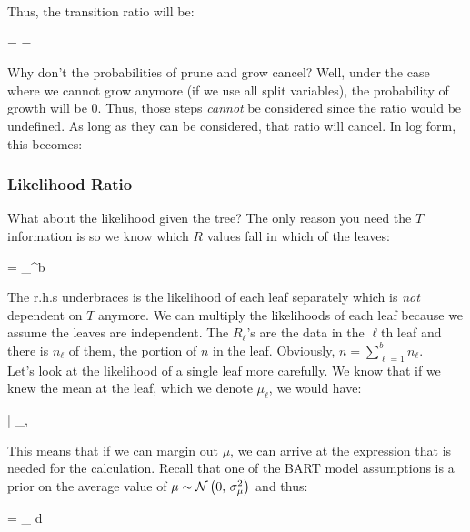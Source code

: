 Thus, the transition ratio will be:

\beqn
{} =  =  
\eeqn

Why don't the probabilities of prune and grow cancel? Well, under the case where we cannot grow anymore (if we use all split variables), the probability of growth will be 0. Thus, those steps \textit{cannot} be considered since the ratio would be undefined. As long as they can be considered, that ratio will cancel. In log form, this becomes:


\subsubsection*{Likelihood Ratio}


What about the likelihood given the tree? The only reason you need the $T$ information is so we know which $R$ values fall in which of the leaves:

\beqn
{} = \prod_{}^{b} \underbrace{\cprob{\Rlonetonl}{\sigsq}}
\eeqn

The r.h.s underbraces is the likelihood of each leaf separately which is \textit{not} dependent on $T$ anymore. We can multiply the likelihoods of each leaf because we assume the leaves are independent. The $R_\ell$'s are the data in the $\ell$th leaf and there is $n_\ell$ of them, the portion of $n$ in the leaf. Obviously, $n = \sum_{\ell=1}^b n_\ell$.\\

Let's look at the likelihood of a single leaf more carefully. We know that if we knew the mean at the leaf, which we denote $\mu_\ell$, we would have:

\beqn
\Rlonetonl | \mu_\ell, \sigsq ~\iid~ \normnot{\mu}{\sigsq}
\eeqn

This means that if we can margin out $\mu$, we can arrive at the expression that is needed for the calculation. Recall that one of the BART model assumptions is a prior on the average value of $\mu \sim \mathcal{N}\left(0,\,\sigma^2_\mu\right)$ and thus:

\beqn
\cprob{\Rlonetonl}{\sigsq} = \int_\reals \cprob{\Rlonetonl}{\mu, \sigsq} \prob{\mu; \sigsq_\mu} d\mu
\eeqn

